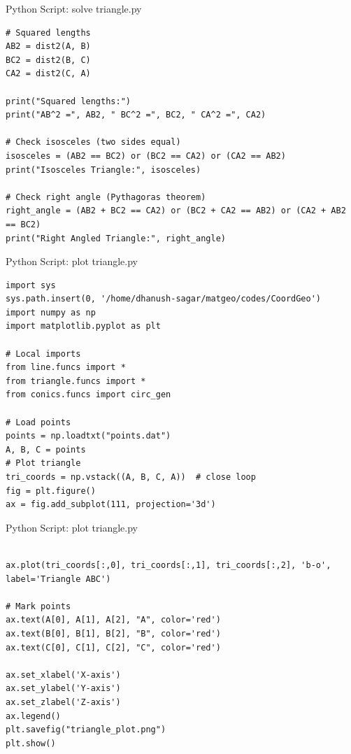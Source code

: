 \documentclass{beamer}
\numberwithin{equation}{section}
\theoremstyle{remark}
\begin{document}
\begin{frame}[fragile]{Python Script: solve triangle.py}
\begin{verbatim}
# Squared lengths
AB2 = dist2(A, B)
BC2 = dist2(B, C)
CA2 = dist2(C, A)

print("Squared lengths:")
print("AB^2 =", AB2, " BC^2 =", BC2, " CA^2 =", CA2)

# Check isosceles (two sides equal)
isosceles = (AB2 == BC2) or (BC2 == CA2) or (CA2 == AB2)
print("Isosceles Triangle:", isosceles)

# Check right angle (Pythagoras theorem)
right_angle = (AB2 + BC2 == CA2) or (BC2 + CA2 == AB2) or (CA2 + AB2 == BC2)
print("Right Angled Triangle:", right_angle)
\end{verbatim}
\end{frame}

\begin{frame}[fragile]{Python Script: plot triangle.py}
\begin{verbatim}
import sys
sys.path.insert(0, '/home/dhanush-sagar/matgeo/codes/CoordGeo')
import numpy as np
import matplotlib.pyplot as plt

# Local imports
from line.funcs import *
from triangle.funcs import *
from conics.funcs import circ_gen

# Load points
points = np.loadtxt("points.dat")
A, B, C = points
# Plot triangle
tri_coords = np.vstack((A, B, C, A))  # close loop
fig = plt.figure()
ax = fig.add_subplot(111, projection='3d')
\end{verbatim}
\end{frame}

\begin{frame}[fragile]{Python Script: plot triangle.py}
\begin{verbatim}

ax.plot(tri_coords[:,0], tri_coords[:,1], tri_coords[:,2], 'b-o', label='Triangle ABC')

# Mark points
ax.text(A[0], A[1], A[2], "A", color='red')
ax.text(B[0], B[1], B[2], "B", color='red')
ax.text(C[0], C[1], C[2], "C", color='red')

ax.set_xlabel('X-axis')
ax.set_ylabel('Y-axis')
ax.set_zlabel('Z-axis')
ax.legend()
plt.savefig("triangle_plot.png")
plt.show()

\end{verbatim}
\end{frame}
\end{document}
